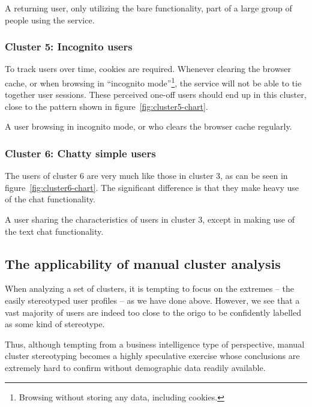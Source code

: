 \begin{persona}
  A returning user, only utilizing the bare functionality, part of a large group of people using the service.
\end{persona}

\subsubsection{Cluster 5: Incognito users}

To track users over time, cookies are required. Whenever clearing the browser cache, or when browsing in ``incognito mode''\footnote{Browsing without storing any data, including cookies.}, the service will not be able to tie together user sessions. These perceived one-off users should end up in this cluster, close to the pattern shown in figure~\ref{fig:cluster5-chart}.

\begin{persona}
  A user browsing in incognito mode, or who clears the browser cache regularly.
\end{persona}

\subsubsection{Cluster 6: Chatty simple users}

The users of cluster 6 are very much like those in cluster 3, as can be seen in figure~\ref{fig:cluster6-chart}. The significant difference is that they make heavy use of the chat functionality.

\begin{persona}
  A user sharing the characteristics of users in cluster 3, except in making use of the text chat functionality.
\end{persona}

\subsection{The applicability of manual cluster analysis}
\label{eval:sub:cluster_analysis_applicability}

When analyzing a set of clusters, it is tempting to focus on the extremes -- the easily stereotyped user profiles -- as we have done above. However, we see that a vast majority of users are indeed too close to the origo to be confidently labelled as some kind of stereotype.

Thus, although tempting from a business intelligence type of perspective, manual cluster stereotyping becomes a highly speculative exercise whose conclusions are extremely hard to confirm without demographic data readily available.

